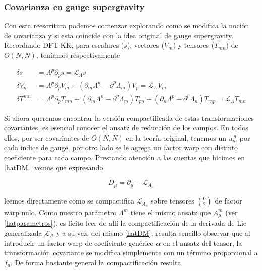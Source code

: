 \documentclass{article}
\numberwithin{equation}{section}
\begin{document}
\subsubsection{Covarianza en gauge supergravity} 

Con esta reescritura podemos comenzar explorando como se modifica la noción de covarianza y si esta coincide con la idea original de gauge supergravity.\\

Recordando DFT-KK, para escalares ($ s $), vectores ($ V_{m} $) y tensores ($ T_{m n} $) de $ O(N,N) $, teníamos respectivamente

\begin{equation}\label{ONNcov}
\begin{aligned}
\delta s &= \Lambda^p \partial_p s = \mathcal{L}_{\Lambda} s\\
\delta V_{m} &= \Lambda^p \partial_p V_{m} + \left(\partial_m \Lambda^p - \partial^p \Lambda_m \right) V_p = \mathcal{L}_{\Lambda} V_{m} \\
\delta T^{m n} &= \Lambda^p \partial_p T_{m n} + \left(\partial_m \Lambda^p - \partial^p \Lambda_m \right) T_{p n} + \left(\partial_n \Lambda^p - \partial^p \Lambda_n \right) T_{m p} = \mathcal{L}_{\Lambda} T_{m n}
\end{aligned}
\end{equation}

Si ahora queremos encontrar la versión compactificada de estas transformaciones covariantes, es esencial conocer el ansatz de reducción de los campos. En todos ellos, por ser covariantes de $ O(N,N) $ en la teoría original, tenemos un $ u_m^{\ a} $ por cada indice de gauge, por otro lado se le agrega un factor warp con distinto coeficiente para cada campo. Prestando atención a las cuentas que hicimos en \ref{hatDM}, vemos que expresando 

\begin{equation}
D_{\mu} = \partial_{\mu} - \mathcal{L}_{A_{\mu}}
\end{equation}

leemos directamente como se compactifica $ \mathcal{L}_{A_{\mu}} $ sobre tensores  $ \binom{0}{2} $ de factor warp nulo. Como nuestro parámetro $ \Lambda^m $ tiene el mismo ansatz que $ A_{\mu}^{m} $ (ver \ref{hatparametros}), es lícito leer de allí la compactificación de la derivada de Lie generalizada $ \mathcal{L}_{\Lambda} $ y a su vez, del mismo \ref{hatDM}, resulta sencillo observar que al introducir un factor warp de coeficiente genérico $ \alpha $ en el ansatz del tensor, la transformación covariante se modifica simplemente con un término proporcional a $ f_a $. De forma bastante general la compactificación resulta
\end{document}
